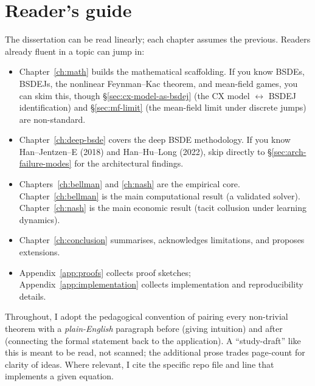 \section{Reader's guide}
\label{sec:readers-guide}

The dissertation can be read linearly; each chapter assumes the previous. Readers already fluent in a topic can jump in:

\begin{itemize}
  \item Chapter~\ref{ch:math} builds the mathematical scaffolding. If you know BSDEs, BSDEJs, the nonlinear Feynman--Kac theorem, and mean-field games, you can skim this, though \S\ref{sec:cx-model-as-bsdej} (the CX model $\leftrightarrow$ BSDEJ identification) and \S\ref{sec:mf-limit} (the mean-field limit under discrete jumps) are non-standard.
  \item Chapter~\ref{ch:deep-bsde} covers the deep BSDE methodology. If you know Han--Jentzen--E (2018) and Han--Hu--Long (2022), skip directly to \S\ref{sec:arch-failure-modes} for the architectural findings.
  \item Chapters~\ref{ch:bellman} and \ref{ch:nash} are the empirical core. Chapter~\ref{ch:bellman} is the main computational result (a validated solver). Chapter~\ref{ch:nash} is the main economic result (tacit collusion under learning dynamics).
  \item Chapter~\ref{ch:conclusion} summarises, acknowledges limitations, and proposes extensions.
  \item Appendix~\ref{app:proofs} collects proof sketches; Appendix~\ref{app:implementation} collects implementation and reproducibility details.
\end{itemize}

\medskip

Throughout, I adopt the pedagogical convention of pairing every non-trivial theorem with a \emph{plain-English} paragraph before (giving intuition) and after (connecting the formal statement back to the application). A ``study-draft'' like this is meant to be read, not scanned; the additional prose trades page-count for clarity of ideas. Where relevant, I cite the specific repo file and line that implements a given equation.
